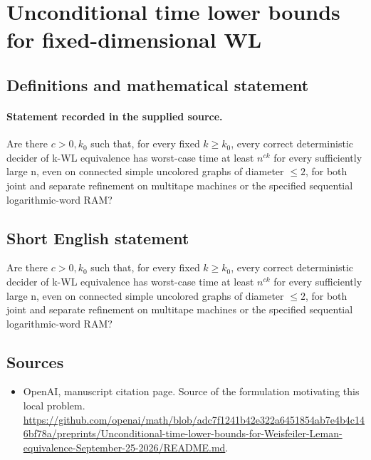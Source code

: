 \documentclass[11pt]{article}
\begin{document}
\section*{Unconditional time lower bounds for fixed-dimensional WL}\label{statement}
\subsection{Definitions and mathematical statement}
\paragraph{Statement recorded in the supplied source.}
Are there $c>0,k_{0}$ such that, for every fixed $k\geq k_{0}$, every correct deterministic decider of k-WL equivalence has worst-case time at least $n^{ck}$ for every sufficiently large n, even on connected simple uncolored graphs of diameter $\leq 2$, for both joint and separate refinement on multitape machines or the specified sequential logarithmic-word RAM?
\subsection{Short English statement}
Are there $c>0,k_{0}$ such that, for every fixed $k\geq k_{0}$, every correct deterministic decider of k-WL equivalence has worst-case time at least $n^{ck}$ for every sufficiently large n, even on connected simple uncolored graphs of diameter $\leq 2$, for both joint and separate refinement on multitape machines or the specified sequential logarithmic-word RAM?
\subsection{Sources}
\begin{itemize}
\item[S1] OpenAI, manuscript citation page. Source of the formulation motivating this local problem.
\url{https://github.com/openai/math/blob/adc7f1241b42e322a6451854ab7e4b4c146bf78a/preprints/Unconditional-time-lower-bounds-for-Weisfeiler-Leman-equivalence-September-25-2026/README.md}.
\end{itemize}
\end{document}
